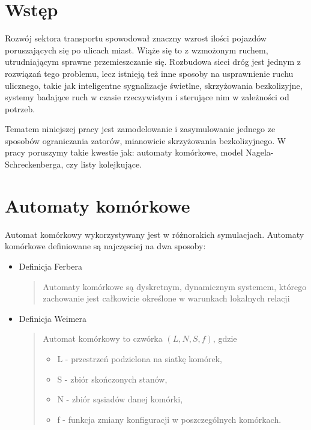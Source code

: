 \documentclass{sprawozdanie-agh}
\begin{document}
   


	\stronatytulowa{}

	\begin{multicols}{2}

	\section{Wstęp}

		Rozwój sektora transportu spowodował znaczny wzrost ilości pojazdów poruszających się po ulicach miast. Wiąże się to z wzmożonym ruchem, utrudniającym sprawne przemieszczanie się. Rozbudowa sieci dróg jest jednym z rozwiązań tego problemu, lecz istnieją też inne sposoby na usprawnienie ruchu ulicznego, takie jak inteligentne sygnalizacje świetlne, skrzyżowania bezkolizyjne, systemy badające ruch w czasie rzeczywistym i sterujące nim w zależności od potrzeb.

		Tematem niniejszej pracy jest zamodelowanie i zasymulowanie jednego ze sposobów ograniczania zatorów, mianowicie skrzyżowania bezkolizyjnego. W pracy poruszymy takie kwestie jak: automaty komórkowe, model Nagela-Schreckenberga, czy listy kolejkujące.

	\section{Automaty komórkowe}

		Automat komórkowy wykorzystywany jest w różnorakich symulacjach. Automaty komórkowe definiowane są najczęsciej na dwa sposoby:

		\begin{itemize}
			\item Definicja Ferbera
				\begin{quote}
					Automaty komórkowe są dyskretnym, dynamicznym systemem, którego zachowanie jest całkowicie określone w warunkach lokalnych relacji
				\end{quote}
			\item Definicja Weimera
				\begin{quote}
					Automat komórkowy to czwórka $(L,N,S,f)$, gdzie
					\begin{itemize}
						\item L - przestrzeń podzielona na siatkę komórek,
						\item S - zbiór skończonych stanów,
						\item N - zbiór sąsiadów danej komórki,
						\item f - funkcja zmiany konfiguracji w poszczególnych komórkach.
					\end{itemize}
				\end{quote}
		\end{itemize}


\end{multicols}
\end{document}
